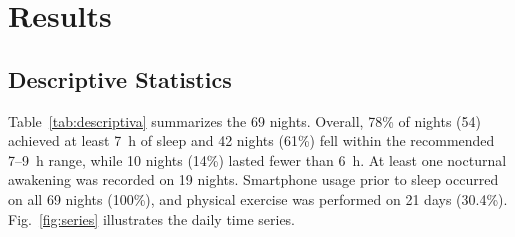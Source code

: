 \documentclass[conference]{IEEEtran}
\begin{document}
\section{Results}

\subsection{Descriptive Statistics}
Table~\ref{tab:descriptiva} summarizes the 69 nights. Overall, 78\% of nights (54) achieved at least 7~h of sleep and 42 nights (61\%) fell within the recommended 7--9~h range, while 10 nights (14\%) lasted fewer than 6~h. At least one nocturnal awakening was recorded on 19 nights. Smartphone usage prior to sleep occurred on all 69 nights (100\%), and physical exercise was performed on 21 days (30.4\%). Fig.~\ref{fig:series} illustrates the daily time series.
\end{document}
